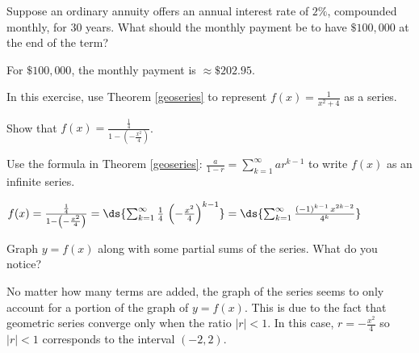 \documentclass{ximera}
\begin{document}
\begin{problem}
    Suppose an ordinary annuity offers an annual interest rate of $2 \%$, compounded monthly, for 30 years. What should the monthly payment be to have $\$100,\!000$ at the end of the term?

\begin{solution}
For $\$100,\!000$, the monthly payment is $\approx \$202.95$.
\end{solution}
\end{problem}

\begin{question}\label{seriesforfunctionex}  
In this exercise, use Theorem \ref{geoseries}  to represent  $f(x) = \frac{1}{x^2+4}$ as a series.

\begin{problem}
    Show that $f(x) = \frac{\frac{1}{4}}{1 - \left( -\frac{x^2}{4} \right)}$.
\end{problem}

\begin{problem}
    Use the formula  in Theorem \ref{geoseries}: $\frac{a}{1-r} =  {\sum_{k=1}^{\infty} ar^{k-1}}$ to write $f(x)$ as an infinite series.

\begin{solution}
$f(x) = \frac{\frac{1}{4}}{1 - \left( -\frac{x^2}{4} \right)} = \ds{\sum_{k=1}^{\infty} \frac{1}{4} \,\left( -\frac{x^2}{4} \right)^{k-1}} = \ds{\sum_{k=1}^{\infty} \frac{(-1)^{k-1} \, x^{2k-2}}{4^{k}}} $
\end{solution}
\end{problem}

\begin{problem}
    Graph $y = f(x)$ along with some partial sums of the series.  What do you notice?

\begin{solution}
No matter how many terms are added, the graph of the series seems to only account for a portion of the graph of $y = f(x)$.  This is due to the fact that geometric series converge only when the ratio $|r| < 1$.  In this case, $r =  -\frac{x^2}{4}$ so $|r| < 1$ corresponds to the interval $(-2,2)$.
\end{solution}
\end{problem}


\end{question}
\end{document}
